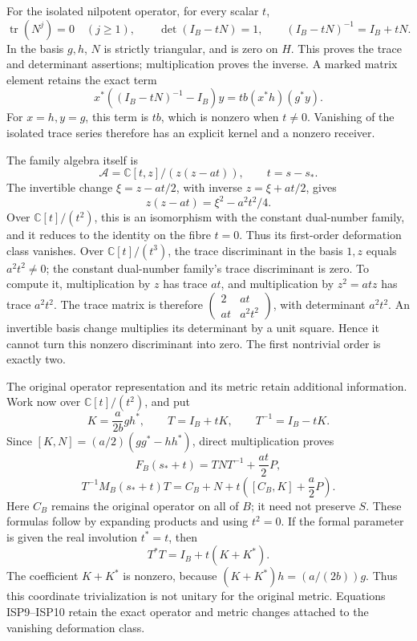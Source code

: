 \documentclass[
  10pt,
  a4paper,
]{article}
\begin{document}
For the isolated nilpotent operator, for every scalar \(t\), \[
\operatorname{tr}(N^j)=0\quad(j\ge1),\qquad
\det(I_B-tN)=1,\qquad
(I_B-tN)^{-1}=I_B+tN.
\tag{ISP6}
\] In the basis \(g,h\), \(N\) is strictly triangular, and is zero on
\(H\). This proves the trace and determinant assertions; multiplication
proves the inverse. A marked matrix element retains the exact term \[
x^*((I_B-tN)^{-1}-I_B)y
=tb(x^*h)(g^*y).
\tag{ISP7}
\] For \(x=h,y=g\), this term is \(tb\), which is nonzero when
\(t\ne0\). Vanishing of the isolated trace series therefore has an
explicit kernel and a nonzero receiver.

The family algebra itself is \[
\mathcal A=\mathbb C[t,z]/(z(z-at)),\qquad t=s-s_*.
\] The invertible change \(\xi=z-at/2\), with inverse \(z=\xi+at/2\),
gives \[
z(z-at)=\xi^2-a^2t^2/4.
\tag{ISP8}
\] Over \(\mathbb C[t]/(t^2)\), this is an isomorphism with the constant
dual-number family, and it reduces to the identity on the fibre \(t=0\).
Thus its first-order deformation class vanishes. Over
\(\mathbb C[t]/(t^3)\), the trace discriminant in the basis \(1,z\)
equals \(a^2t^2\ne0\); the constant dual-number family's trace
discriminant is zero. To compute it, multiplication by \(z\) has trace
\(at\), and multiplication by \(z^2=at z\) has trace \(a^2t^2\). The
trace matrix is therefore
\(\left(\begin{smallmatrix}2&at\\at&a^2t^2\end{smallmatrix}\right)\),
with determinant \(a^2t^2\). An invertible basis change multiplies its
determinant by a unit square. Hence it cannot turn this nonzero
discriminant into zero. The first nontrivial order is exactly two.

The original operator representation and its metric retain additional
information. Work now over \(\mathbb C[t]/(t^2)\), and put \[
K=\frac{a}{2b}gh^*,\qquad T=I_B+tK,\qquad T^{-1}=I_B-tK.
\] Since \([K,N]=(a/2)(gg^*-hh^*)\), direct multiplication proves \[
F_B(s_*+t)=TNT^{-1}+\frac{at}{2}P,
\] \[
T^{-1}M_B(s_*+t)T
=C_B+N+t\left([C_B,K]+\frac a2P\right).
\tag{ISP9}
\] Here \(C_B\) remains the original operator on all of \(B\); it need
not preserve \(S\). These formulas follow by expanding products and
using \(t^2=0\). If the formal parameter is given the real involution
\(t^*=t\), then \[
T^*T=I_B+t(K+K^*).
\tag{ISP10}
\] The coefficient \(K+K^*\) is nonzero, because \((K+K^*)h=(a/(2b))g\).
Thus this coordinate trivialization is not unitary for the original
metric. Equations ISP9--ISP10 retain the exact operator and metric
changes attached to the vanishing deformation class.
\end{document}
